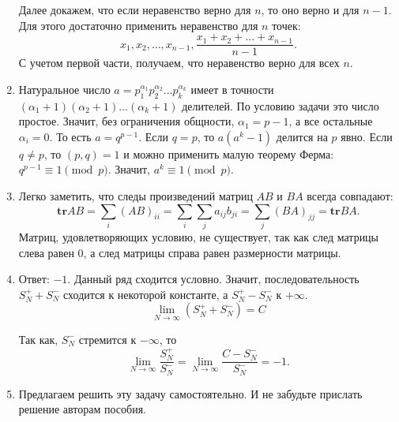 \documentclass[11pt, a4paper]{article}
\begin{document}
\begin{enumerate}
Далее докажем, что если неравенство верно для $n$, то оно верно и для $n-1$. Для этого достаточно применить неравенство для $n$ точек:
$$x_1, x_2, \ldots, x_{n-1}, \frac{x_1 + x_2 + ... + x_{n-1}}{n-1}.$$
С учетом первой части, получаем, что неравенство верно для всех $n$.

\item Натуральное число $a = p_1^{\alpha_1} p_2^{\alpha_2} ... p_k^{\alpha_k}$ имеет в точности $(\alpha_1 + 1) (\alpha_2 + 1) ... (\alpha_k + 1)$ делителей. По условию задачи это число простое. Значит,  без ограничения общности, $\alpha_1 = p - 1$, а все остальные $\alpha_i = 0$. То есть $a = q ^ {p-1}$. Если $q = p$, то $a (a^k - 1)$ делится на $p$ явно. Если $q \neq p$, то $(p, q) = 1$ и можно применить малую теорему Ферма: $q^{p-1} \equiv 1 \pmod p$. Значит, $a^k \equiv 1 \pmod p$.

\item Легко заметить, что следы произведений матриц $AB$ и $BA$ всегда совпадают:
$$\mathbf{tr} AB = \sum_i (AB)_{ii} = \sum_i \sum_j a_{ij} b_{ji} =  \sum_j (BA)_{jj} = \mathbf{tr} BA.$$
Матриц, удовлетворяющих условию, не существует, так как след матрицы слева равен 0, а след матрицы справа равен размерности матрицы.

\item Ответ: $-1$. Данный ряд сходится условно. Значит, последовательность $S_N^{+}+S_N^{-}$ сходится к некоторой константе, а $S_N^{+}-S_N^{-}$ к $+\infty$. $$\lim\limits_{N \rightarrow \infty}(S_N^{+}+S_N^{-}) = C$$

Так как, $S_N^{-}$ стремится к $-\infty$, то 
$$\lim\limits_{N \rightarrow \infty} \frac{S_N^{+}}{S_N^{-}} = \lim\limits_{N \rightarrow \infty} \frac{C - S_N^{-}}{S_N^{-}} = -1.$$

\item Предлагаем решить эту задачу самостоятельно. И не забудьте прислать решение авторам пособия.

\end{enumerate}
\end{document}
